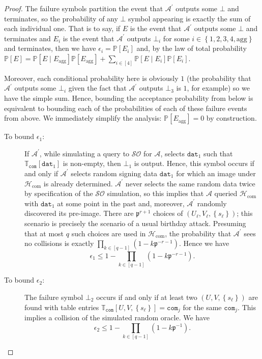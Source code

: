 \documentclass{iacrtrans}
\theoremstyle{definition}
\numberwithin{theorem}{subsection}
\numberwithin{lemma}{theorem}
\newcommand{\adversary}{\mathcal{A}}
\newcommand{\p}{\mathfrak{p}}
\begin{document}
\begin{proof}

The failure symbols partition the event that $\adversary^\prime$ outputs some $\bot$ and terminates, so the probability of any $\bot$ symbol appearing is exactly the sum of each individual one. That is to say, if $E$ is the event that $\adversary^\prime$ outputs some $\bot$ and terminates and $E_i$ is the event that $\adversary^\prime$ outputs  $\bot_i$ for some $ i \in \left\{1,2,3,4,\text{agg}\right\}$ and terminates, then we have $\epsilon_i = \mathbb{P}[E_i]$ and, by the law of total probability $\mathbb{P}[E] = \mathbb{P}[E \mid E_{\text{agg}}]\mathbb{P}[E_{\text{agg}}] + \sum_{i \in [4]} \mathbb{P}[E \mid E_i]\mathbb{P}[E_i]$.

Moreover, each conditional probability here is obviously $1$ (the probability that $\adversary^\prime$ outputs some $\bot_i$ given the fact that $\adversary^\prime$ outputs $\bot_3$ is $1$, for example) so we have the simple sum. Hence, bounding the acceptance probability from below is equivalent to bounding each of the probabilities of each of these failure events from above. We immediately simplify the analysis: $\mathbb{P}[E_{\text{agg}}] = 0$ by construction. %
\begin{description}
\item [To bound $\epsilon_1$:] If $\adversary^\prime$, while simulating a query to $\mathcal{SO}$ for $\adversary$, selects $\texttt{dat}_1$ such that $\mathbb{T}_{\texttt{com}}[\texttt{dat}_1]$ is non-empty, then $\bot_1$ is output. Hence, this symbol occurs if and only if $\adversary^\prime$ selects random signing data $\texttt{dat}_1$ for which an image under $\mathcal{H}_{\text{com}}$ is already determined. $\adversary^\prime$ never selects the same random data twice by specification of the $\mathcal{SO}$ simulation, so this implies that $\adversary$ queried $\mathcal{H}_{\text{com}}$ with $\texttt{dat}_1$ at some point in the past and, moreover, $\adversary^\prime$ randomly discovered its pre-image. There are $\p^{r+1}$ choices of $(U_\ell, V_\ell, \left\{s_\ell\right\})$; this scenario is precisely the scenario of a usual birthday attack. Presuming that at most $q$ such choices are used in $\mathcal{H}_{\text{com}}$, the probability that $\adversary^\prime$ sees no collisions is exactly $\prod_{k \in [q-1]}(1 - k\mathfrak{p}^{-r-1})$. Hence we have
\[\epsilon_1 \leq 1 - \prod_{k \in [q-1]}(1 - k\mathfrak{p}^{-r-1}).\]

\item [To bound $\epsilon_2$:] The failure symbol $\bot_2$ occurs if and only if at least two $(U, V, \left\{s_\ell\right\})$ are found with table entries $\mathbb{T}_{\texttt{com}}[U,V,\left\{s_\ell\right\}] = \texttt{com}_j$ for the same $\texttt{com}_j$. This implies a collision of the simulated random oracle. We have
\[\epsilon_2 \leq 1 - \prod_{k \in [q-1]} (1-k\mathfrak{p}^{-1}).\]


\end{description}
\end{proof}
\end{document}
